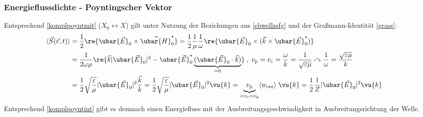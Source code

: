 	  \subsubsection{Energieflussdichte - Poyntingscher Vektor}
	  	Entsprechend \ref{komplpoyntmit} ($X_0\leftrightarrow X$) gilt unter Nutzung der Beziehungen aus \ref{ebwellzsfg} und der Graßmann-Identität \ref{grass}:
	  	\begin{equation}\label{enflussdicht}\begin{split}
	  			\langle \vec{S}(\vec{r} , t)\rangle &= \frac{1}{2}\re{\ubar{\vec{E}}_0 \times \vec{\ubar{H}}_0^\star} = \frac{1}{2} \frac{1}{\mu} \frac{1}{\omega} \re{\ubar{\vec{E}}_0 \times (\vec{k} \times \ubar{\vec{E}}_0^\star)}\\
	  			&= \frac{1}{2\omega\mu} \re{ \vec{k} |\ubar{\vec{E}}_0|^2 - \ubar{\vec{E}}_0^\star \underbrace{(\ubar{\vec{E}}_0 \cdot \vec{k})}_{=0} } \; , \;  v_\mathrm{p}= v_\mathrm{c} = \frac{\omega}{ k} = \frac{1}{\sqrt{\varepsilon\mu}} \curvearrowright \frac{1}{\omega} = \frac{\sqrt{\varepsilon\mu}}{ k}\\
	  			&= \frac{1}{2} \sqrt{\frac{\varepsilon}{\mu}} |\ubar{\vec{E}}_0|^2 \frac{\vec{k}}{ k} = \frac{1}{2} \sqrt{\frac{\varepsilon}{\mu}} |\ubar{\vec{E}}_0|^2 \vu{k} = \underbrace{ v_\mathrm{p}}_{= v_\mathrm{c}= v_\mathrm{g}} \langle   w_\mathrm{em}\rangle\; \vu{k} = \frac{1}{2} \frac{1}{Z} |\ubar{\vec{E}}_0|^2 \vu{k}
	  	\end{split}\end{equation}
	  	Entsprechend \ref{komplpoyntint} gibt es demnach einen Energiefluss mit der Ausbreitungsgeschwindigkeit in Ausbreitungsrichtung der Welle.  
